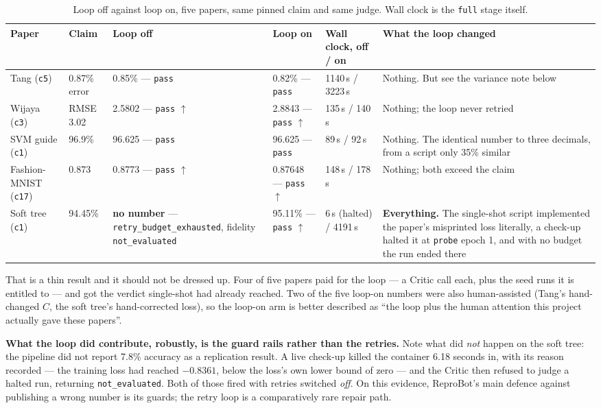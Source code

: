 \documentclass[11pt]{article}
\newcommand{\squeeze}{\setlength{\tabcolsep}{4pt}}
\begin{document}
\begin{table}[tbp]
\centering
\small
\caption{Loop off against loop on, five papers, same pinned claim and same judge. Wall clock is
the \texttt{full} stage itself.}
\label{tab:ablation}
\squeeze
\begin{tabular}{L{0.12\textwidth}L{0.09\textwidth}L{0.155\textwidth}L{0.145\textwidth}L{0.09\textwidth}L{0.24\textwidth}}
\toprule
Paper & Claim & Loop off & Loop on & Wall clock, off / on & What the loop changed \\
\midrule
Tang (\texttt{c5}) & 0.87\% error & 0.85\% --- \texttt{pass} & 0.82\% --- \texttt{pass} & 1140\,s /
  3223\,s & Nothing. But see the variance note below \\
Wijaya (\texttt{c3}) & RMSE 3.02 & 2.5802 --- \texttt{pass} $\uparrow$ & 2.8843 ---
  \texttt{pass} $\uparrow$ & 135\,s / 140\,s & Nothing; the loop never retried \\
SVM guide (\texttt{c1}) & 96.9\% & 96.625 --- \texttt{pass} & 96.625 --- \texttt{pass} & 89\,s /
  92\,s & Nothing. The identical number to three decimals, from a script only 35\% similar \\
Fashion-MNIST (\texttt{c17}) & 0.873 & 0.8773 --- \texttt{pass} $\uparrow$ & 0.87648 ---
  \texttt{pass} $\uparrow$ & 148\,s / 178\,s & Nothing; both exceed the claim \\
Soft tree (\texttt{c1}) & 94.45\% & \textbf{no number} --- \texttt{retry\_}\allowbreak\texttt{budget\_}\allowbreak\texttt{exhausted},
  fidelity \texttt{not\_}\allowbreak\texttt{evaluated} & 95.11\% --- \texttt{pass} $\uparrow$ & 6\,s (halted) /
  4191\,s & \textbf{Everything.} The single-shot script implemented the paper's misprinted loss
  literally, a check-up halted it at \texttt{probe} epoch 1, and with no budget the run ended
  there \\
\bottomrule
\end{tabular}
\end{table}

That is a thin result and it should not be dressed up. Four of five papers paid for the loop ---
a Critic call each, plus the seed runs it is entitled to --- and got the verdict single-shot had
already reached. Two of the five loop-on numbers were also human-assisted (Tang's hand-changed
$C$, the soft tree's hand-corrected loss), so the loop-on arm is better described as ``the loop
plus the human attention this project actually gave these papers''.

\textbf{What the loop did contribute, robustly, is the guard rails rather than the retries.} Note
what did \emph{not} happen on the soft tree: the pipeline did not report 7.8\% accuracy as a
replication result. A live check-up killed the container 6.18 seconds in, with its reason
recorded --- the training loss had reached $-0.8361$, below the loss's own lower bound of zero ---
and the Critic then refused to judge a halted run, returning \texttt{not\_evaluated}. Both of
those fired with retries switched \emph{off}. On this evidence, ReproBot's main defence against
publishing a wrong number is its guards; the retry loop is a comparatively rare repair path.
\end{document}
